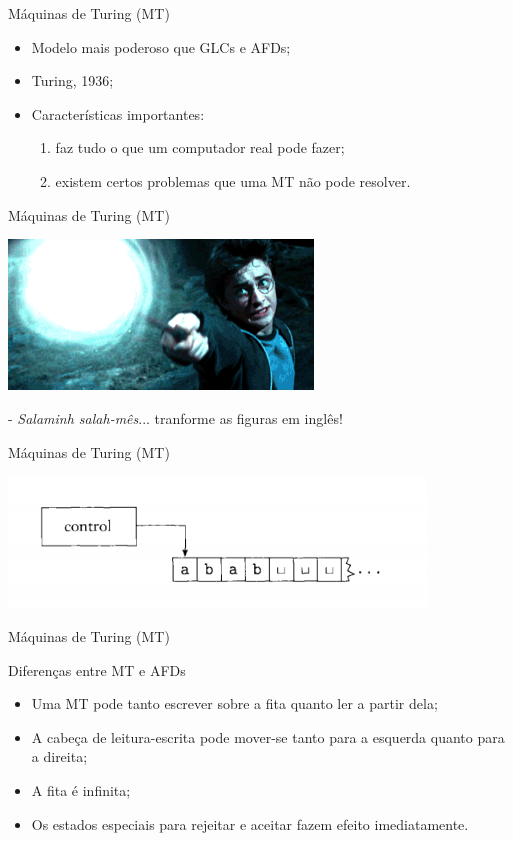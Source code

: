 \documentclass[xcolor=dvipsnames,table]{beamer}
\begin{document}
	\begin{frame}{Máquinas de Turing (MT)}
		\begin{itemize}
			\item Modelo mais poderoso que GLCs e AFDs; \pause
			\item Turing, 1936; \pause
			\item Características importantes:
				\begin{enumerate}
					\item faz tudo o que um computador real pode fazer;
					\item existem certos problemas que uma MT não pode resolver.
				\end{enumerate}				 
			
		\end{itemize}
	\end{frame}
	
	\begin{frame}{Máquinas de Turing (MT)}
		\begin{center}
			\includegraphics[height=4cm]{images/harry.png}
			
			- {\it Salaminh salah-mês}... tranforme as figuras em inglês!
		\end{center}
	\end{frame}	
	
	\begin{frame}{Máquinas de Turing (MT)}
		\begin{center}
			\includegraphics[height=3.5cm]{images/fig31.png}
		\end{center}
	\end{frame}
	
	\begin{frame}{Máquinas de Turing (MT)}
		\begin{block}{Diferenças entre MT e AFDs}
			\begin{itemize}
				\item Uma MT pode tanto escrever sobre a fita quanto ler a partir dela;
				\item A cabeça de leitura-escrita pode mover-se tanto para a esquerda quanto para a direita;
				\item A fita é infinita;
				\item Os estados especiais para rejeitar e aceitar fazem efeito imediatamente.
			\end{itemize}
		\end{block}
	\end{frame}
	
\end{document}
